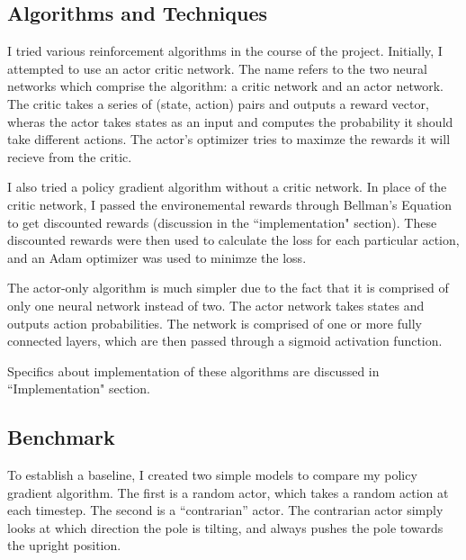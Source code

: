 \documentclass[12pt,a4paper]{article}
\begin{document}
\subsection*{Algorithms and Techniques}

I tried various reinforcement algorithms in the course of the project. Initially, I attempted to use an actor critic network. The name refers to the two neural networks which comprise the algorithm: a critic network and an actor network. The critic takes a series of (state, action) pairs and outputs a reward vector, wheras the actor takes states as an input and computes the probability it should take different actions. The actor's optimizer tries to maximze the rewards it will recieve from the critic. 

I also tried a policy gradient algorithm without a critic network. In place of the critic network, I passed the environemental rewards through Bellman's Equation to get discounted rewards (discussion in the ``implementation" section). These discounted rewards were then used to calculate the loss for each particular action, and an Adam optimizer was used to minimze the loss.

The actor-only algorithm is much simpler due to the fact that it is comprised of only one neural network instead of two. The actor network takes states and outputs action probabilities. The network is comprised of one or more fully connected layers, which are then passed through a sigmoid activation function.

Specifics about implementation of these algorithms are discussed in ``Implementation" section.


\subsection*{Benchmark}
To establish a baseline, I created two simple models to compare my policy gradient algorithm. The first is a random actor, which takes a random action at each timestep. The second is a ``contrarian'' actor. The contrarian actor simply looks at which direction the pole is tilting, and always pushes the pole towards the upright position.
\end{document}
